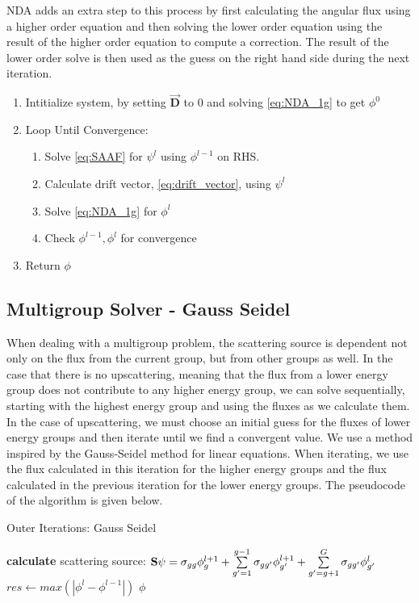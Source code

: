 NDA adds an extra step to this process by first calculating the angular flux using a higher order equation and then solving the lower order equation using the result of the higher order equation to compute a correction. The result of the lower order solve is then used as the guess on the right hand side during the next iteration. 

\begin{enumerate}
    \item Intitialize system, by setting $\vec{\textbf{D}}$ to 0 and solving \eqref{eq:NDA_1g} to get $\phi^0$ 
    \item Loop Until Convergence:
        \begin{enumerate}
            \item Solve \eqref{eq:SAAF} for $\psi^l$ using $\phi^{l-1}$ on RHS.
            \item Calculate drift vector, \eqref{eq:drift_vector}, using $\psi^l$
            \item Solve \eqref{eq:NDA_1g} for $\phi^l$
            \item Check $\phi^{l-1}, \phi^l$ for convergence
        \end{enumerate}
    \item Return $\phi$
\end{enumerate}

\subsection{Multigroup Solver - Gauss Seidel}
When dealing with a multigroup problem, the scattering source is dependent not only on the flux from the current group, but from other groups as well. In the case that there is no upscattering, meaning that the flux from a lower energy group does not contribute to any higher energy group, we can solve sequentially, starting with the highest energy group and using the fluxes as we calculate them. In the case of upscattering, we must choose an initial guess for the fluxes of lower energy groups and then iterate until we find a convergent value. We use a method inspired by the Gauss-Seidel method for linear equations. When iterating, we use the flux calculated in this iteration for the higher energy groups and the flux calculated in the previous iteration for the lower energy groups. The pseudocode of the algorithm is given below. 
\begin{algorithm}
\caption{Outer Iterations: Gauss Seidel}
\begin{algorithmic}
     
            \State \textbf{calculate} scattering source: \State $ {\bf S} \psi = \sigma_{gg}\phi_g^{l+1} + \sum\limits_{g'=1}^{g-1} \sigma_{gg'} \phi_{g'}^{l+1} + \sum\limits_{g'=g+1}^G \sigma_{gg'}\phi_{g'}^l$
        \EndProcedure
        \EndFor
        \State $res \gets max(|\phi^{l} - \phi^{l-1}|)$  
        \EndWhile
    \Return $\phi$
\end{algorithmic}
\end{algorithm}

